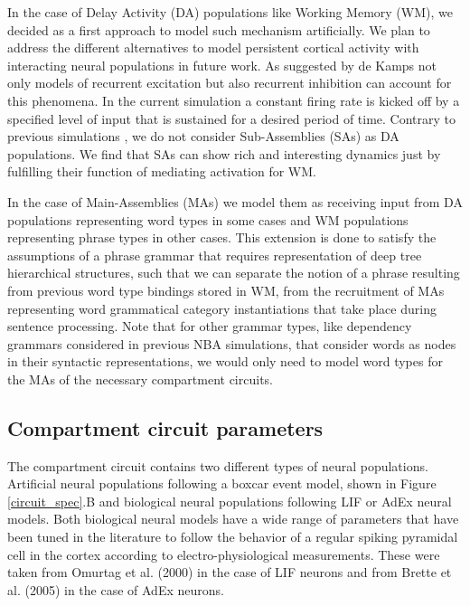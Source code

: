 \documentclass[10pt]{article}
\begin{document}
In the case of Delay Activity (DA) populations like Working Memory (WM), we decided as a first approach to model such mechanism artificially.
We plan to address the different alternatives to model persistent cortical activity with interacting neural populations in future work.
As suggested by de Kamps\cite{de_Kamps_2005} not only models of recurrent excitation but also recurrent inhibition can account for this phenomena.
In the current simulation a constant firing rate is kicked off by a specified level of input that is sustained for a desired period of time.
Contrary to previous simulations \cite{velde2015ambiguity}, we do not consider Sub-Assemblies (SAs) as DA populations.
We find that SAs can show rich and interesting dynamics just by fulfilling their function of mediating activation for WM.

In the case of Main-Assemblies (MAs) we model them as receiving input from DA populations representing word types in some cases and WM populations representing phrase types in other cases.
This extension is done to satisfy the assumptions of a phrase grammar that requires representation of deep tree hierarchical structures, such that we can separate the notion of a phrase resulting from previous word type bindings stored in WM, from the recruitment of MAs representing word grammatical category instantiations that take place during sentence processing.
Note that for other grammar types, like dependency grammars considered in previous NBA simulations\cite{velde2015ambiguity}, that consider words as nodes in their syntactic representations, we would only need to model word types for the MAs of the necessary compartment circuits.


\subsection{Compartment circuit parameters}\label{compartment-circuit-parameters}

The compartment circuit contains two different types of neural populations.
Artificial neural populations following a boxcar event model, shown in Figure \ref{circuit_spec}.B and biological neural populations following LIF or AdEx neural models.
Both biological neural models have a wide range of parameters that have been tuned in the literature to follow the behavior of a regular spiking pyramidal cell in the cortex according to electro-physiological measurements.
These were taken from Omurtag et al. (2000) \cite{omurtag2000simulation} in the case of LIF neurons and from Brette et al.
(2005) \cite{Brette_2005} in the case of AdEx neurons.
\end{document}

